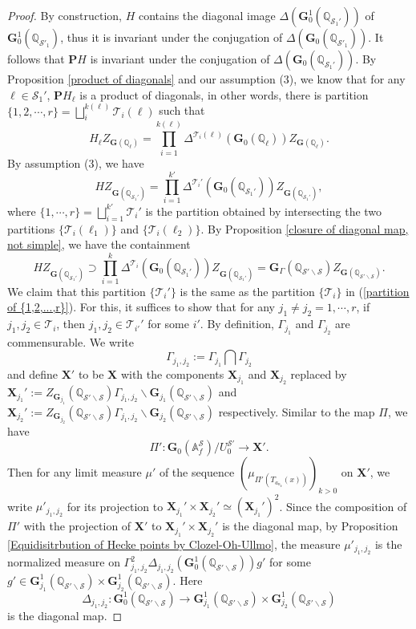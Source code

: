 \documentclass[11pt,oneside,reqno]{amsart}
\newcommand{\bfG}{\mathbf{G}}
\newcommand{\A}{\mathbb{A}}
\newcommand{\Q}{\mathbb{Q}}
\newcommand{\Scal}{\mathcal{S}}
\newcommand{\Tcal}{\mathcal{T}}
\newcommand{\Gbf}{\mathbf{G}}
\newcommand{\Pbf}{\mathbf{P}}
\newcommand{\Xbf}{\mathbf{X}}
\newcommand{\bcS}{\mathcal{S}}
\theoremstyle{plain}
\begin{document}
\begin{proof}
		
		
		
		By construction, $H$ contains the diagonal image $\Delta(\Gbf_0^1(\Q_{\Scal_1'}))$ of $\bfG_0^1(\Q_{\bcS'_1})$, thus it is invariant under the conjugation of $\Delta(\bfG_0(\Q_{\bcS'_1}))$. It follows that $\Pbf H$ is invariant under the conjugation of $\Delta(\Gbf_0(\Q_{\Scal_1'}))$. By Proposition \ref{product of diagonals} and our assumption (3), we know that for any $\ell\in\Scal_1'$, $\Pbf H_\ell$ is a product of diagonals, in other words, there is partition
		$\{1,2,\cdots,r\}=\bigsqcup_{i}^{k(\ell)}\mathcal{T}_i(\ell)$ such that
		\[
		H_\ell Z_{\Gbf(\Q_\ell)}
		=\prod_{i=1}^{k(\ell)}
		\Delta^{\mathcal{T}_i(\ell)}(\bfG_0(\Q_\ell))
		Z_{\Gbf(\Q_\ell)}.
		\]
		By assumption (3), we have
		\[
		HZ_{\Gbf(\Q_{\Scal_1'})}
		=
		\prod_{i=1}^{k'}\Delta^{\Tcal_i'}(\Gbf_0(\Q_{\Scal_1'}))
		Z_{\Gbf(\Q_{\Scal_1'})},
		\]
		where $\{1,\cdots,r\}=\bigsqcup_{i=1}^{k'}\Tcal_i'$ is the partition obtained by intersecting the two partitions $\{\Tcal_i(\ell_1)\}$ and $\{\Tcal_i(\ell_2)\}$. 
		By Proposition \ref{closure of diagonal map, not simple}, we have the containment
		\[
		HZ_{\Gbf(\Q_{\Scal_1'})}
		\supset
		\prod_{i=1}^{k}\Delta^{\Tcal_i}(\Gbf_0(\Q_{\Scal_1'}))
		Z_{\Gbf(\Q_{\Scal_1'})}
		=
		\Gbf_\Gamma(\Q_{\Scal'\backslash\Scal})
		Z_{\Gbf(\Q_{\Scal'\backslash\Scal})}.
		\]
		We claim that this partition $\{\Tcal_i'\}$ is the same as the partition $\{\Tcal_i\}$ in (\ref{partition of {1,2,...,r}}). For this, it suffices to show that for any $j_1\neq j_2=1,\cdots,r$, if $j_1,j_2\in\Tcal_i$, then $j_1,j_2\in\Tcal_{i'}'$ for some $i'$. By definition, $\Gamma_{j_1}$ and $\Gamma_{j_2}$ are commensurable. We write
		\[
		\Gamma_{j_1,j_2}:=\Gamma_{j_1}\bigcap\Gamma_{j_2}
		\]
		and define $\Xbf'$ to be $\Xbf$ with the components $\Xbf_{j_1}$ and $\Xbf_{j_2}$ replaced by $\Xbf_{j_1}':=Z_{\Gbf_{j_1}}(\Q_{{\bcS'}\backslash\bcS})
		\Gamma_{j_1,j_2}\backslash\Gbf_{j_1}(\Q_{\Scal'\backslash\Scal})$
		and
		$\Xbf_{j_2}':=Z_{\Gbf_{j_2}}(\Q_{{\bcS'}\backslash\bcS})
		\Gamma_{j_1,j_2}\backslash\Gbf_{j_2}(\Q_{\Scal'\backslash\Scal})$ respectively. Similar to the map $\Pi$, we have
		\[
		\Pi'
		\colon
		\Gbf_0(\A_f^\Scal)/U_0^{\Scal'}
		\to
		\Xbf'.
		\]
		Then for any limit measure $\mu'$ of the sequence $(\mu_{\Pi'(T_{a_{n_k}}(x))})_{k>0}$ on $\Xbf'$, we write $\mu'_{j_1,j_2}$ for its projection to $\Xbf_{j_1}'\times\Xbf_{j_2}'\simeq(\Xbf_{j_1}')^2$. Since the composition of $\Pi'$ with the projection of $\Xbf'$ to $\Xbf_{j_1}'\times\Xbf_{j_2}'$ is the diagonal map, by Proposition \ref{Equidisitrbution of Hecke points by Clozel-Oh-Ullmo}, the measure $\mu'_{j_1,j_2}$ is the normalized measure on $\Gamma_{j_1,j_2}^2\Delta_{j_1,j_2}(\Gbf_0^1(\Q_{\Scal'\backslash\Scal}))g'$ for some $g'\in\Gbf_{j_1}^1(\Q_{\Scal'\backslash\Scal})
		\times
		\Gbf_{j_2}^1(\Q_{\Scal'\backslash\Scal})$. Here
		\[
		\Delta_{j_1,j_2}
		\colon
		\Gbf_0^1(\Q_{\Scal'\backslash\Scal})
		\to
		\Gbf_{j_1}^1(\Q_{\Scal'\backslash\Scal})
		\times
		\Gbf_{j_2}^1(\Q_{\Scal'\backslash\Scal})
		\]
		is the diagonal map.
		

\end{proof}
\end{document}
